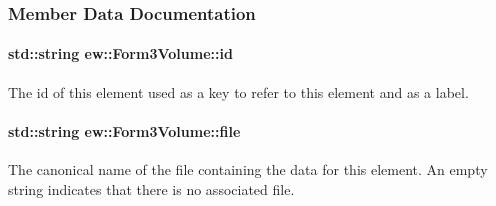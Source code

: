 \subsubsection{Member Data Documentation}
\hypertarget{classew_1_1Form3Volume_aede415929600c673c12b8d99f600ea37}{
\paragraph[{id}]{\setlength{\rightskip}{0pt plus 5cm}std::string {\bf ew::Form3Volume::id}}\hfill}
\label{classew_1_1Form3Volume_aede415929600c673c12b8d99f600ea37}
The id of this element used as a key to refer to this element and as a label. \hypertarget{classew_1_1Form3Volume_a7d4cf297939871fcf11e037758d5e2fe}{
\paragraph[{file}]{\setlength{\rightskip}{0pt plus 5cm}std::string {\bf ew::Form3Volume::file}}\hfill}
\label{classew_1_1Form3Volume_a7d4cf297939871fcf11e037758d5e2fe}
The canonical name of the file containing the data for this element. An empty string indicates that there is no associated file. 